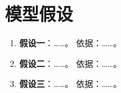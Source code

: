 \section{模型假设}


\begin{enumerate}
  \item \textbf{假设一}：……。
        依据：……。
  \item \textbf{假设二}：……。
        依据：……。
  \item \textbf{假设三}：……。
        依据：……。
\end{enumerate}
